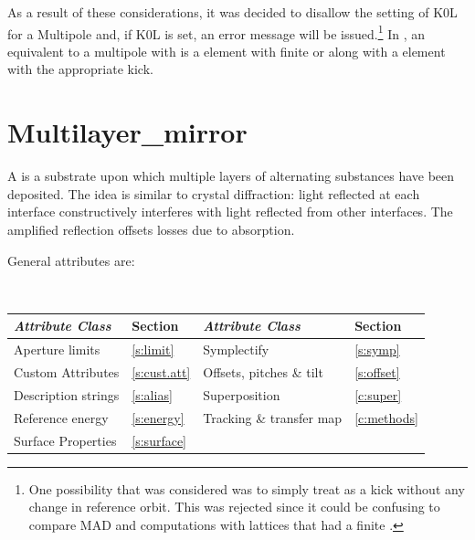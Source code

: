{%

As a result of these considerations, it was decided to disallow the setting of K0L for a Multipole
and, if K0L is set, an error message will be issued.\footnote
  {
One possibility that was considered was to simply treat  as a kick without any change in
reference orbit.  This was rejected since it could be confusing to compare MAD and \bmad
computations with lattices that had a finite .
  }
In \bmad, an equivalent to a multipole with  is a  element with finite
 or  along with a  element with the appropriate kick.

\newpage

\section{Multilayer_mirror}
\label{s:multilayer}

A  is a substrate upon which multiple layers of alternating substances have
been deposited. The idea is similar to crystal diffraction: light reflected at each interface
constructively interferes with light reflected from other interfaces. The amplified reflection
offsets losses due to absorption.

General  attributes are:
\begin{center}
\tt
\begin{tabular}{llll} \toprule
  {\sl Attribute Class}      & Section           & {\sl Attribute Class}      & Section         \\ \midrule
  Aperture limits            & \ref{s:limit}     & Symplectify                & \ref{s:symp}    \\
  Custom Attributes          & \ref{s:cust.att}  & Offsets, pitches \& tilt   & \ref{s:offset}  \\
  Description strings        & \ref{s:alias}     & Superposition              & \ref{c:super}   \\
  Reference energy           & \ref{s:energy}    & Tracking \& transfer map   & \ref{c:methods} \\
  Surface Properties         & \ref{s:surface}   &                            &                 \\
  \bottomrule
\end{tabular}
\end{center}
\toffset

}
